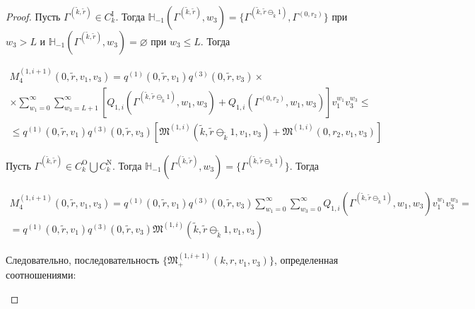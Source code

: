 \documentclass[a4paper,12pt,russian]{extarticle}
\begin{document}
\begin{proof}
Пусть $\Gamma^{(\tilde{k},\tilde{r})}\in C_k^{\mathrm{I}}$. Тогда ${\mathbb H}_{-1}(\Gamma^{(\tilde{k},\tilde{r})}, w_3) = \{\Gamma^{(\tilde{k},\tilde{r}\ominus_{\tilde{k}} 1)}, \Gamma^{(0,r_2)}\}$ при $w_3 >  L$ и ${\mathbb H}_{-1}(\Gamma^{(\tilde{k},\tilde{r})}, w_3) = \varnothing$ при $w_3 \leqslant L$. Тогда

\begin{multline*}
 M^{(1,i+1)}_4(0,\tilde{r},v_1,v_3) = q^{(1)}(0,\tilde{r},v_1)  q^{(3)}(0,\tilde{r},v_3) \times \\ \times
 \sum_{w_1=0}^{\infty}\sum_{w_3=L+1}^{\infty} [ Q_{1,i}(\Gamma^{(\tilde{k},\tilde{r}\ominus_{\tilde{k}} 1)},w_1,w_3) + Q_{1,i}(\Gamma^{(0,r_2)},w_1,w_3) ]   v_1^{w_1}  v_3^{w_3}\leqslant \\ \leqslant
 q^{(1)}(0,\tilde{r},v_1)  q^{(3)}(0,\tilde{r},v_3) [\mathfrak{M}^{(1,i)}(\tilde{k},\tilde{r}\ominus_{\tilde{k}} 1,v_1,v_3)  + \mathfrak{M}^{(1,i)}(0,r_2,v_1,v_3) ]
\end{multline*}


Пусть $\Gamma^{(\tilde{k},\tilde{r})}\in C_k^{\mathrm{O}} \bigcup C_k^{\mathrm{N}}$. Тогда ${\mathbb H}_{-1}(\Gamma^{(\tilde{k},\tilde{r})}, w_3) = \{\Gamma^{(\tilde{k},\tilde{r}\ominus_{\tilde{k}} 1)}\}$. Тогда

\begin{multline*}
 M^{(1,i+1)}_4(0,\tilde{r},v_1,v_3) = q^{(1)}(0,\tilde{r},v_1)  q^{(3)}(0,\tilde{r},v_3)  \sum_{w_1=0}^{\infty}\sum_{w_3=0}^{\infty}  Q_{1,i}(\Gamma^{(\tilde{k},\tilde{r}\ominus_{\tilde{k}} 1)},w_1,w_3)    v_1^{w_1} v_3^{w_3}= \\ =
q^{(1)}(0,\tilde{r},v_1)  q^{(3)}(0,\tilde{r},v_3)  \mathfrak{M}^{(1,i)}(\tilde{k},\tilde{r}\ominus_{\tilde{k}} 1,v_1,v_3)  
\end{multline*}


Следовательно, последовательность $\{\mathfrak{M}_+^{(1,i+1)}(k,r,v_1,v_3)\}$, определенная соотношениями:
\begin{enumerate}


\end{enumerate}
\end{proof}
\end{document}
